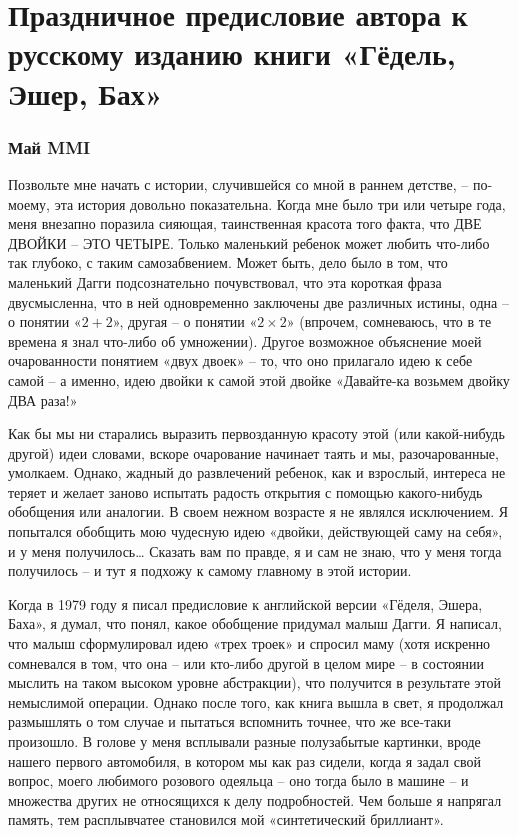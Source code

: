 \documentclass[../main.tex]{subfiles}
\begin{document}

\chapter[Предисловие]{Праздничное предисловие автора к русскому изданию книги «Гёдель, Эшер, Бах»}

\subsection{Май MMI}

Позвольте мне начать с истории, случившейся со мной в раннем детстве, \--- по-моему, эта история довольно показательна. Когда мне было три или четыре года, меня внезапно поразила сияющая, таинственная красота того факта, что ДВЕ ДВОЙКИ \--- ЭТО ЧЕТЫРЕ\@. Только маленький ребенок может любить что-либо так глубоко, с таким самозабвением. Может быть, дело было в том, что маленький Дагги подсознательно почувствовал, что эта короткая фраза двусмысленна, что в ней одновременно заключены две различных истины, одна \--- о понятии «$2 + 2$», другая \--- о понятии «$2 \times 2$» (впрочем, сомневаюсь, что в те времена я знал что-либо об умножении). Другое возможное объяснение моей очарованности понятием «двух двоек» \--- то, что оно прилагало идею к себе самой \--- а именно, идею двойки к самой этой двойке «Давайте-ка возьмем двойку ДВА раза!»

Как бы мы ни старались выразить первозданную красоту этой (или какой-нибудь другой) идеи словами, вскоре очарование начинает таять и мы, разочарованные, умолкаем. Однако, жадный до развлечений ребенок, как и взрослый, интереса не теряет и желает заново испытать радость открытия с помощью какого-нибудь обобщения или аналогии. В своем нежном возрасте я не являлся исключением. Я попытался обобщить мою чудесную идею «двойки, действующей саму на себя», и у меня получилось\ldots{} Сказать вам по правде, я и сам не знаю, что у меня тогда получилось \--- и тут я подхожу к самому главному в этой истории.

Когда в 1979 году я писал предисловие к английской версии «Гёделя, Эшера, Баха», я думал, что понял, какое обобщение придумал малыш Дагги. Я написал, что малыш сформулировал идею «трех троек» и спросил маму (хотя искренно сомневался в том, что она \--- или кто-либо другой в целом мире \--- в состоянии мыслить на таком высоком уровне абстракции), что получится в результате этой немыслимой операции. Однако после того, как книга вышла в свет, я продолжал размышлять о том случае и пытаться вспомнить точнее, что же все-таки произошло. В голове у меня всплывали разные полузабытые картинки, вроде нашего первого автомобиля, в котором мы как раз сидели, когда я задал свой вопрос, моего любимого розового одеяльца \--- оно тогда было в машине \--- и множества других не относящихся к делу подробностей. Чем больше я напрягал память, тем расплывчатее становился мой «синтетический бриллиант».
\end{document}
